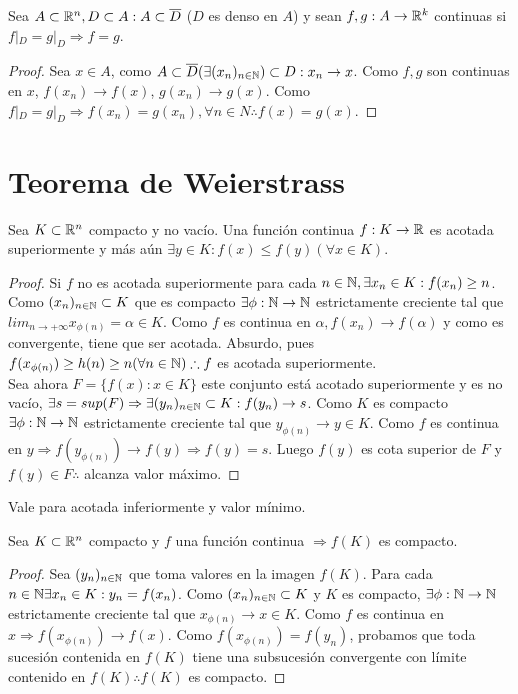 \begin{prop}
  Sea $A \subset \mathbb{R}^n, D \subset A : A \subset \overline{D}$ ($D$ es denso en $A$) y sean $f, g : A \to \mathbb{R}^k$ continuas si $f|_D = g|_D \Rightarrow f=g$.

  \begin{proof}
    Sea $x \in A$, como $A \subset \overline{D} (\exists (x_n)_{n \in \mathbb{N}}) \subset D : x_n \to x$. Como $f, g$ son continuas en $x$, $f(x_n) \to f(x)$, $g(x_n) \to g(x)$. Como $f|_D = g|_D \Rightarrow f(x_n) = g(x_n), \forall n \in N \therefore f(x) = g(x)$.
  \end{proof}
\end{prop}

\section{Teorema de Weierstrass}

\begin{theorem}[Weiertrass]
  Sea $K \subset \mathbb{R}^n$ compacto y no vacío. Una función continua $f: K \to \mathbb{R}$ es acotada superiormente y más aún $\exists y \in K : f(x) \leq f(y) (\forall x \in K)$.
  \begin{proof}
    Si $f$ no es acotada superiormente para cada $n \in \mathbb{N}, \exists x_n \in K : f(x_n) \geq n$. Como $(x_n)_{n \in \mathbb{N}} \subset K$ que es compacto $\exists \phi: \mathbb{N} \to \mathbb{N}$ estrictamente creciente tal que $lim_{n \to +\infty} x_{\phi(n)} = \alpha \in K$. Como $f$ es continua en $\alpha, f(x_n) \to f(\alpha)$ y como es convergente, tiene que ser acotada. Absurdo, pues $f(x_{\phi(n)}) \geq h(n) \geq n (\forall n \in \mathbb{N}) \therefore f$ es acotada superiormente. \\
    Sea ahora $F = \{ f(x) : x \in K\}$ este conjunto está acotado superiormente y es no vacío, $\exists s = sup(F) \Rightarrow \exists (y_n)_{n \in \mathbb{N}} \subset K : f(y_n) \to s$. Como $K$ es compacto $\exists \phi : \mathbb{N} \to \mathbb{N}$ estrictamente creciente tal que $y_{\phi(n)} \to y \in K$. Como $f$ es continua en $y \Rightarrow f(y_{\phi(n)}) \to f(y) \Rightarrow f(y) = s$. Luego $f(y)$ es cota superior de $F$ y $f(y) \in F \therefore$ alcanza valor máximo.
  \end{proof}
\end{theorem}

\begin{note}
  Vale para acotada inferiormente y valor mínimo.
\end{note}

\begin{theorem}
  Sea $K \subset \mathbb{R}^n$ compacto y $f$ una función continua $\Rightarrow f(K)$ es compacto.
  \begin{proof}
    Sea $(y_n)_{n \in \mathbb{N}}$ que toma valores en la imagen $f(K)$. Para cada $n \in \mathbb{N} \exists x_n \in K : y_n = f(x_n)$. Como $(x_n)_{n \in \mathbb{N}} \subset K$ y $K$ es compacto, $\exists \phi : \mathbb{N} \to \mathbb{N}$ estrictamente creciente tal que $x_{\phi(n)} \to x \in K$. Como $f$ es continua en $x \Rightarrow f(x_{\phi(n)}) \to f(x)$. Como $f(x_{\phi(n)}) = f(y_n)$, probamos que toda sucesión contenida en $f(K)$ tiene una subsucesión convergente con límite contenido en $f(K) \therefore f(K)$ es compacto.
  \end{proof}
\end{theorem}

